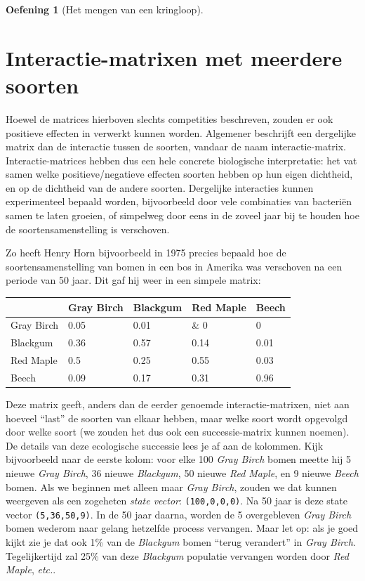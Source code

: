 \documentclass[
  a4paper,
]{scrbook}
\theoremstyle{definition}
\newtheorem{exercise}{Oefening}[chapter]
\theoremstyle{remark}
\begin{document}
\begin{exercise}[Het mengen van een
kringloop]
\section{Interactie-matrixen met meerdere
soorten}\label{interactie-matrixen-met-meerdere-soorten}

Hoewel de matrices hierboven slechts competities beschreven, zouden er
ook positieve effecten in verwerkt kunnen worden. Algemener beschrijft
een dergelijke matrix dan de interactie tussen de soorten, vandaar de
naam interactie-matrix. Interactie-matrices hebben dus een hele concrete
biologische interpretatie: het vat samen welke positieve/negatieve
effecten soorten hebben op hun eigen dichtheid, en op de dichtheid van
de andere soorten. Dergelijke interacties kunnen experimenteel bepaald
worden, bijvoorbeeld door vele combinaties van bacteriën samen te laten
groeien, of simpelweg door eens in de zoveel jaar bij te houden hoe de
soortensamenstelling is verschoven.

Zo heeft Henry Horn bijvoorbeeld in 1975 precies bepaald hoe de
soortensamenstelling van bomen in een bos in Amerika was verschoven na
een periode van 50 jaar. Dit gaf hij weer in een simpele matrix:

\begin{longtable}[]{@{}lllll@{}}
\toprule\noalign{}
& Gray Birch & Blackgum & Red Maple & Beech \\
\midrule\noalign{}
\endhead
\bottomrule\noalign{}
\endlastfoot
Gray Birch & 0.05 & 0.01 & \& 0 & 0 \\
Blackgum & 0.36 & 0.57 & 0.14 & 0.01 \\
Red Maple & 0.5 & 0.25 & 0.55 & 0.03 \\
Beech & 0.09 & 0.17 & 0.31 & 0.96 \\
\end{longtable}

Deze matrix geeft, anders dan de eerder genoemde interactie-matrixen,
niet aan hoeveel ``last'' de soorten van elkaar hebben, maar welke soort
wordt opgevolgd door welke soort (we zouden het dus ook een
successie-matrix kunnen noemen). De details van deze ecologische
successie lees je af aan de kolommen. Kijk bijvoorbeeld naar de eerste
kolom: voor elke 100 \emph{Gray Birch} bomen meette hij 5 nieuwe
\emph{Gray Birch}, 36 nieuwe \emph{Blackgum}, 50 nieuwe \emph{Red
Maple}, en 9 nieuwe \emph{Beech} bomen. Als we beginnen met alleen maar
\emph{Gray Birch}, zouden we dat kunnen weergeven als een zogeheten
\emph{state vector}: \texttt{(100,0,0,0)}. Na 50 jaar is deze state
vector \texttt{(5,36,50,9)}. In de 50 jaar daarna, worden de 5
overgebleven \emph{Gray Birch} bomen wederom naar gelang hetzelfde
process vervangen. Maar let op: als je goed kijkt zie je dat ook 1\% van
de \emph{Blackgum} bomen ``terug verandert'' in \emph{Gray Birch}.
Tegelijkertijd zal 25\% van deze \emph{Blackgum} populatie vervangen
worden door \emph{Red Maple}, \emph{etc.}.


\end{exercise}
\end{document}
